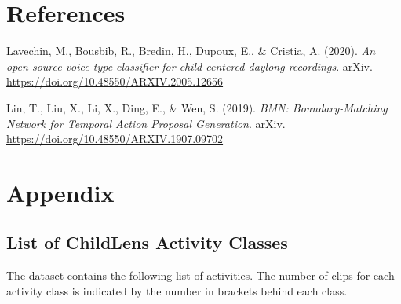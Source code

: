 \documentclass[
  man,floatsintext]{apa6}
\newlength{\cslhangindent}
\newenvironment{CSLReferences}[2] %
 {\begin{list}{}{%
  \setlength{\itemindent}{0pt}
  \setlength{\leftmargin}{0pt}
  \setlength{\parsep}{0pt}
  \ifodd #1
   \setlength{\leftmargin}{\cslhangindent}
   \setlength{\itemindent}{-1\cslhangindent}
  \fi
  \setlength{\itemsep}{#2\baselineskip}}}
 {\end{list}}
\begin{document}
\newpage

\section{References}\label{references}

\begingroup
\setlength{\parindent}{-0.5in}
\setlength{\leftskip}{0.5in}

\label{refs}
\begin{CSLReferences}{1}{0}
Lavechin, M., Bousbib, R., Bredin, H., Dupoux, E., \& Cristia, A. (2020). \emph{An open-source voice type classifier for child-centered daylong recordings}. arXiv. \url{https://doi.org/10.48550/ARXIV.2005.12656}

Lin, T., Liu, X., Li, X., Ding, E., \& Wen, S. (2019). \emph{{BMN}: {Boundary-Matching Network} for {Temporal Action Proposal Generation}}. arXiv. \url{https://doi.org/10.48550/ARXIV.1907.09702}

\end{CSLReferences}

\endgroup

\newpage

\section{Appendix}\label{appendix}

\subsection{List of ChildLens Activity Classes}\label{list-of-childlens-activity-classes}

The dataset contains the following list of activities. The number of clips for each activity class is indicated by the number in brackets behind each class.
\end{document}
